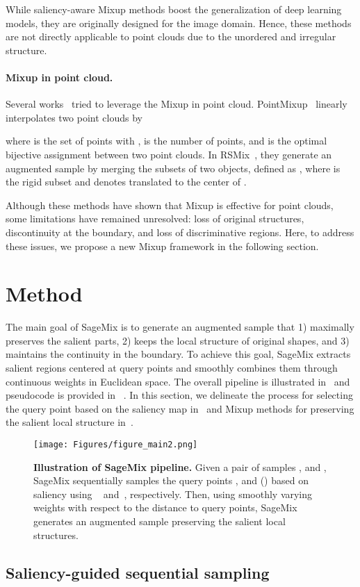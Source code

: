 \documentclass{article}
\begin{document}
While saliency-aware Mixup methods boost the generalization of deep learning models, they are originally designed for the image domain. Hence, these methods are not directly applicable to point clouds due to the unordered and irregular structure.


\paragraph{Mixup in point cloud.} Several works~\cite{chen2020pointmixup, lee2021regularization} tried to leverage the Mixup in point cloud. PointMixup~\cite{chen2020pointmixup} linearly interpolates two point clouds by

where  is the set of points with ,  is the number of points, and  is the optimal bijective assignment between two point clouds.
In RSMix~\cite{lee2021regularization}, they generate an augmented sample by merging the subsets of two objects, defined as , where  is the rigid subset and  denotes  translated to the center of . 

Although these methods have shown that Mixup is effective for point clouds, some limitations have remained unresolved: loss of original structures, discontinuity at the boundary, and loss of discriminative regions.
Here, to address these issues, we propose a new Mixup framework in the following section.
 \section{Method}
\label{sec:method}
The main goal of SageMix is to generate an augmented sample that 1) maximally preserves the salient parts, 2) keeps the local structure of original shapes, and 3) maintains the continuity in the boundary.
To achieve this goal, SageMix extracts salient regions centered at query points and smoothly combines them through continuous weights in Euclidean space. 
The overall pipeline is illustrated in~ and pseudocode is provided in~ . In this section, we delineate the process for selecting the query point based on the saliency map in~ and Mixup methods for preserving the salient local structure in~.

\begin{figure}[t]
\centering
\texttt{[image: Figures/figure\_main2.png]}
\caption{\textbf{Illustration of SageMix pipeline.} 
Given a pair of samples , and , SageMix sequentially samples the query points , and  () based on saliency using ~ and~, respectively. 
Then, using smoothly varying weights with respect to the distance to query points, SageMix generates an augmented sample  preserving the salient local structures.}



\label{fig:figure_main}
\end{figure} \subsection{Saliency-guided sequential sampling}
\label{sec:method.1}
\end{document}
